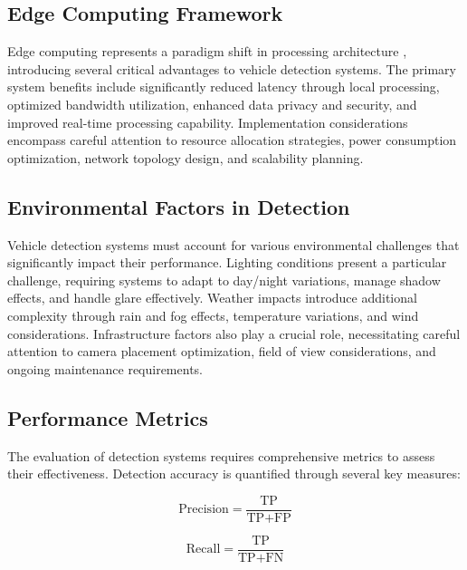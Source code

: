 \subsection{Edge Computing Framework}

Edge computing represents a paradigm shift in processing architecture \cite{Chen2023Edge, aws2024}, introducing several critical advantages to vehicle detection systems. The primary system benefits include significantly reduced latency through local processing, optimized bandwidth utilization, enhanced data privacy and security, and improved real-time processing capability. Implementation considerations encompass careful attention to resource allocation strategies, power consumption optimization, network topology design, and scalability planning.

\subsection{Environmental Factors in Detection}

Vehicle detection systems must account for various environmental challenges that significantly impact their performance. Lighting conditions present a particular challenge, requiring systems to adapt to day/night variations, manage shadow effects, and handle glare effectively. Weather impacts introduce additional complexity through rain and fog effects, temperature variations, and wind considerations. Infrastructure factors also play a crucial role, necessitating careful attention to camera placement optimization, field of view considerations, and ongoing maintenance requirements.

\subsection{Performance Metrics}

The evaluation of detection systems requires comprehensive metrics to assess their effectiveness. Detection accuracy is quantified through several key measures:

\begin{equation}
\mbox{Precision} = \frac{\mbox{TP}}{\mbox{TP} + \mbox{FP}}
\label{eq:precision}
\end{equation}

\begin{equation}
\mbox{Recall} = \frac{\mbox{TP}}{\mbox{TP} + \mbox{FN}}
\label{eq:recall}
\end{equation}

